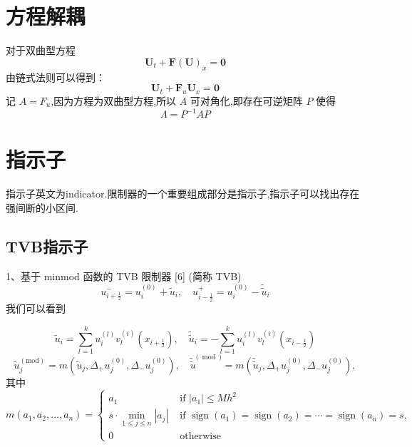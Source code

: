 \documentclass{book}
\begin{document}


\section{方程解耦}
对于双曲型方程
\begin{equation}
    \mathbf{U}_{t}+\mathbf{F}(\mathbf{U})_{x}=\mathbf{0}
\end{equation}
由链式法则可以得到：
\begin{equation}
    \mathbf{U}_{t}+\mathbf{F}_u\mathbf{U}_{x}=\mathbf{0}
\end{equation}
记 $A=F_u$,因为方程为双曲型方程,所以 $A$ 可对角化,即存在可逆矩阵 $P$ 使得
\begin{equation}
    \Lambda = P^{-1}AP
\end{equation}

\section{指示子}
指示子英文为indicator.限制器的一个重要组成部分是指示子,指示子可以找出存在强间断的小区间.
\subsection{TVB指示子}
1、基于 minmod 函数的 TVB 限制器  [6]  (简称 TVB)
\begin{equation}
    u_{i+\frac{1}{2}}^{-}=u_{i}^{(0)}+\tilde{u}_{i}, \quad u_{i-\frac{1}{2}}^{+}=u_{i}^{(0)}-\tilde{\tilde{u}}_{i}
\end{equation}
我们可以看到

\begin{equation}
    \tilde{u}_{i}=\sum_{l=1}^{k} u_{i}^{(l)} v_{l}^{(i)}\left(x_{i+\frac{1}{2}}\right), \quad \tilde{\tilde{u}}_{i}=-\sum_{l=1}^{k} u_{i}^{(l)} v_{l}^{(i)}\left(x_{i-\frac{1}{2}}\right)
\end{equation}
\begin{equation}
    \tilde{u}_{j}^{(\mathrm{mod})}=m\left(\tilde{u}_{j}, \Delta_{+} u_{j}^{(0)}, \Delta_{-} u_{j}^{(0)}\right), \quad \tilde{\tilde{u}}^{(\bmod )}=m\left(\tilde{\tilde{u}}_{j}, \Delta_{+} u_{j}^{(0)}, \Delta_{-} u_{j}^{(0)}\right),
\end{equation}
其中
\begin{equation}
    m\left(a_{1}, a_{2}, \ldots, a_{n}\right)=\begin{cases}
        a_{1}                                             & \text { if }\left|a_{1}\right| \leq M h^{2}                                                                                              \\
        s \cdot \min _{1 \leq j \leq n}\left|a_{j}\right| & \text { if } \operatorname{sign}\left(a_{1}\right)=\operatorname{sign}\left(a_{2}\right)=\cdots=\operatorname{sign}\left(a_{n}\right)=s, \\
        0                                                 & \text { otherwise }
    \end{cases}
\end{equation}
\end{document}
